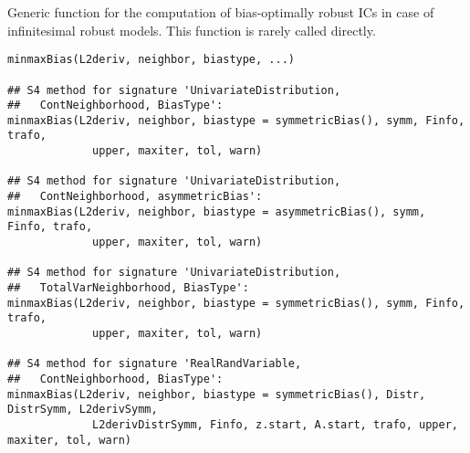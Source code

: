 \begin{Description}\relax
Generic function for the computation of bias-optimally robust ICs 
in case of infinitesimal robust models. This function is 
rarely called directly.
\end{Description}
\begin{Usage}
\begin{verbatim}
minmaxBias(L2deriv, neighbor, biastype, ...)

## S4 method for signature 'UnivariateDistribution,
##   ContNeighborhood, BiasType':
minmaxBias(L2deriv, neighbor, biastype = symmetricBias(), symm, Finfo, trafo, 
             upper, maxiter, tol, warn)

## S4 method for signature 'UnivariateDistribution,
##   ContNeighborhood, asymmetricBias':
minmaxBias(L2deriv, neighbor, biastype = asymmetricBias(), symm, Finfo, trafo, 
             upper, maxiter, tol, warn)

## S4 method for signature 'UnivariateDistribution,
##   TotalVarNeighborhood, BiasType':
minmaxBias(L2deriv, neighbor, biastype = symmetricBias(), symm, Finfo, trafo, 
             upper, maxiter, tol, warn)

## S4 method for signature 'RealRandVariable,
##   ContNeighborhood, BiasType':
minmaxBias(L2deriv, neighbor, biastype = symmetricBias(), Distr, DistrSymm, L2derivSymm, 
             L2derivDistrSymm, Finfo, z.start, A.start, trafo, upper, maxiter, tol, warn)

\end{verbatim}
\end{Usage}
